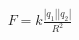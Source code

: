 \documentclass[preview]{standalone}
\begin{document}
\begin{align*}
F = k \frac{|q_1||q_2|}{R^2}
\end{align*}
\end{document}
